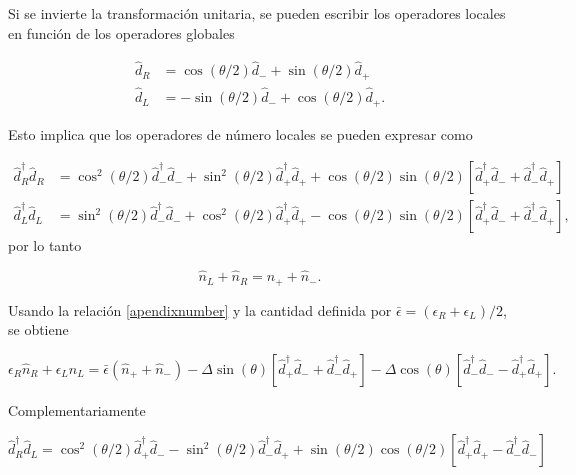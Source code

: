 \begin{appendixs}
Si se invierte la transformación unitaria, se pueden escribir los operadores locales en función de los operadores globales 

\begin{align*}
    \hat{d}_{R} & = \cos(\theta/2)\hat{d}_{-} + \sin(\theta/2)\hat{d}_{+} \\
    \hat{d}_{L} & = -\sin(\theta/2)\hat{d}_{-} + \cos(\theta/2)\hat{d}_{+}.
\end{align*}

Esto implica que los operadores de número locales se pueden expresar como

\begin{align*}
    \hat{d}^{\dagger}_{R}\hat{d}_{R} & = \cos^{2}(\theta/2) \hat{d}^{\dagger}_{-}\hat{d}_{-} + \sin^{2}(\theta/2) \hat{d}^{\dagger}_{+}\hat{d}_{+} + \cos(\theta/2)\sin(\theta/2)[\hat{d}^{\dagger}_{+}\hat{d}_{-} + \hat{d}^{\dagger}_{-}\hat{d}_{+} ] \\
    \hat{d}^{\dagger}_{L}\hat{d}_{L} & = \sin^{2}(\theta/2) \hat{d}^{\dagger}_{-}\hat{d}_{-} + \cos^{2}(\theta/2) \hat{d}^{\dagger}_{+}\hat{d}_{+} - \cos(\theta/2)\sin(\theta/2)[\hat{d}^{\dagger}_{+}\hat{d}_{-} + \hat{d}^{\dagger}_{-}\hat{d}_{+} ],
\end{align*}
por lo tanto 

\begin{equation}
    \hat{n}_{L} + \hat{n}_{R} = \hat{n}_{+} + \hat{n}_{-}.
    \label{apendixnumber}
\end{equation}

Usando la relación \ref{apendixnumber} y la cantidad definida por $\bar{\epsilon} = (\epsilon_{R} + \epsilon_{L})/2$, se obtiene 

\begin{equation}
    \epsilon_{R} \hat{n}_{R} + \epsilon_{L} \hat{n}_{L}  = \bar{\epsilon}( \hat{n}_{+} + \hat{n}_{-} ) - \Delta \sin(\theta) [\hat{d}^{\dagger}_{+}\hat{d}_{-} + \hat{d}^{\dagger}_{-}\hat{d}_{+}] - \Delta \cos(\theta) [\hat{d}^{\dagger}_{-}\hat{d}_{-} - \hat{d}^{\dagger}_{+}\hat{d}_{+}].
\label{apendix5:ec1}
\end{equation}

Complementariamente

\begin{equation}
    \hat{d}^{\dagger}_{R}\hat{d}_{L} = \cos^{2}(\theta/2)\hat{d}^{\dagger}_{+}\hat{d}_{-} - \sin^{2}(\theta/2) \hat{d}^{\dagger}_{-}\hat{d}_{+}  + \sin(\theta/2)\cos(\theta/2)[ \hat{d}^{\dagger}_{+}\hat{d}_{+} - \hat{d}^{\dagger}_{-}\hat{d}_{-} ]
    \label{apendix5:ec2}
\end{equation}


\end{appendixs}
